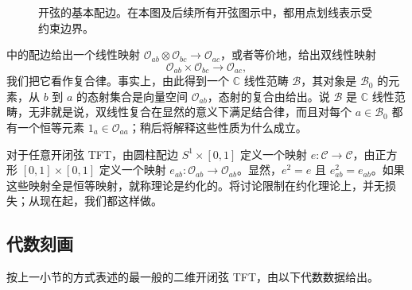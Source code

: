\begin{figure}[H]
\centering
{}
\caption{开弦的基本配边。在本图及后续所有开弦图示中，都用点划线表示受约束边界。}\label{fig:2.1}
\end{figure}

中的配边给出一个线性映射 $\mathcal{O}_{ab}\otimes\mathcal{O}_{bc}\to\mathcal{O}_{ac}$，或者等价地，给出双线性映射
\begin{equation}\label{eq:2.1}
\mathcal{O}_{ab}\times\mathcal{O}_{bc}\longrightarrow\mathcal{O}_{ac},
\end{equation}
我们把它看作复合律。事实上，由此得到一个 $\mathbb{C}$ 线性范畴 $\mathcal{B}$，其对象是 $\mathcal{B}_0$ 的元素，从 $b$ 到 $a$ 的态射集合是向量空间 $\mathcal{O}_{ab}$，态射的复合由给出。说 $\mathcal{B}$ 是 $\mathbb{C}$ 线性范畴，无非就是说，双线性复合在显然的意义下满足结合律，而且对每个 $a\in\mathcal{B}_0$ 都有一个恒等元素 $1_a\in\mathcal{O}_{aa}$；稍后将解释这些性质为什么成立。

对于任意开闭弦 TFT，由圆柱配边 $S^1\times[0,1]$ 定义一个映射 $e\colon\mathcal{C}\to\mathcal{C}$，由正方形 $[0,1]\times[0,1]$ 定义一个映射 $e_{ab}\colon\mathcal{O}_{ab}\to\mathcal{O}_{ab}$。显然，$e^2=e$ 且 $e_{ab}^2=e_{ab}$。如果这些映射全是恒等映射，就称理论是约化的。将讨论限制在约化理论上，并无损失；从现在起，我们都这样做。

\subsection{代数刻画}\label{sec:2.1.2}

按上一小节的方式表述的最一般的二维开闭弦 TFT，由以下代数数据给出。

